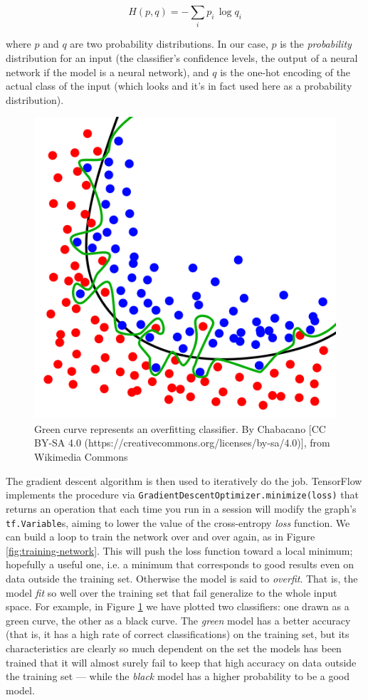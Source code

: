 \[ H(p, q) = - \sum_i {p_i \, \log{q_i}} \]

where $p$ and $q$ are two probability distributions. In our case, $p$
is the \emph{probability} distribution for an input (the classifier's
confidence levels, the output of a neural network if the model is a
neural network), and $q$ is the one-hot encoding of the actual class of
the input (which looks and it's in fact used here as a probability
distribution).

\begin{figure}
  \centering
  \includegraphics[width=0.5\linewidth]{Images/wikipedia-overfitting.png}
  \caption{Green curve represents an overfitting classifier. By
    Chabacano [CC BY-SA 4.0
      (https://creativecommons.org/licenses/by-sa/4.0)], from Wikimedia
    Commons}
  \label{fig:wikipedia-overfitting}
\end{figure}

The gradient descent algorithm is then used to iteratively do the job.
TensorFlow implements the procedure via
\texttt{GradientDescentOptimizer.minimize(loss)} that returns an
operation that each time you run in a session will modify the graph's
\texttt{tf.Variable}s, aiming to lower the value of the cross-entropy
\emph{loss} function. We can build a loop to train the network over and
over again, as in Figure \ref{fig:training-network}. This will push the
loss function toward a local minimum; hopefully a useful one, i.e. a
minimum that corresponds to good results even on data outside the
training set. Otherwise the model is said to \emph{overfit}. That is,
the model \emph{fit} so well over the training set that fail generalize
to the whole input space. For example, in Figure
\ref{fig:wikipedia-overfitting} we have plotted two classifiers: one
drawn as a green curve, the other as a black curve. The \emph{green}
model has a better accuracy (that is, it has a high rate of correct
classifications) on the training set, but its characteristics are
clearly so much dependent on the set the models has been trained that
it will almost surely fail to keep that high accuracy on data outside
the training set --- while the \emph{black} model has a higher
probability to be a good model.

